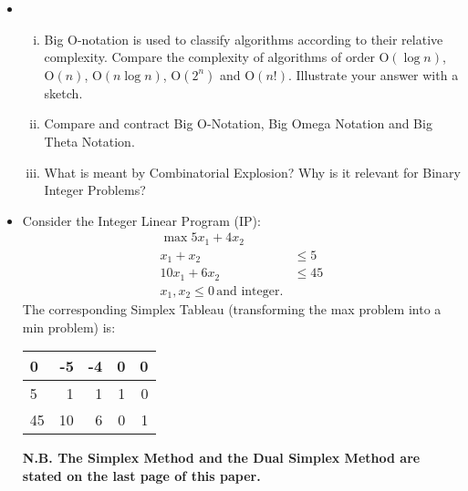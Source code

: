 \documentclass[12pt]{article}
\begin{document}
		\begin{itemize}
	
			
			\item[(a)]
			\begin{enumerate}[(i)]
				\item Big O-notation is used to classify algorithms according to their relative complexity. Compare the complexity of algorithms of order $\mathrm{O}(\log n)$, $\mathrm{O}(n)$, $\mathrm{O}(n\log n)$, $\mathrm{O}(2^n)$ and $\mathrm{O}(n!)$. Illustrate your answer with a sketch. 
				\item Compare and contract Big O-Notation, Big Omega Notation and Big Theta Notation. \marks{2 \% }
			
				\item What is meant by Combinatorial Explosion? Why is it relevant for Binary Integer Problems? 
 													
			\end{enumerate}
			
			
	
			\item[(b)]  Consider the Integer Linear Program (IP):
			\begin{eqnarray*}
				\max 5 x_1 +4 x_2\\
				x_1+x_2&\le 5\\
				10x_1+6x_2 &\le 45\\
				x_1, x_2 \le 0 \, \text{and integer.}
			\end{eqnarray*}
The corresponding Simplex Tableau (transforming the max problem into a min problem)  is:
			\begin{center}
			\begin{tabular}[h]{|l|rrrr|}\hline
				0&-5&-4&0&0\\\hline
				5&1&1&1&0\\
				45&10&6&0&1\\\hline
			\end{tabular}
	\end{center}
		
			{\bf N.B. The Simplex Method and the Dual Simplex Method are stated on the last page  of this paper.}
			

\end{itemize}
\end{document}
